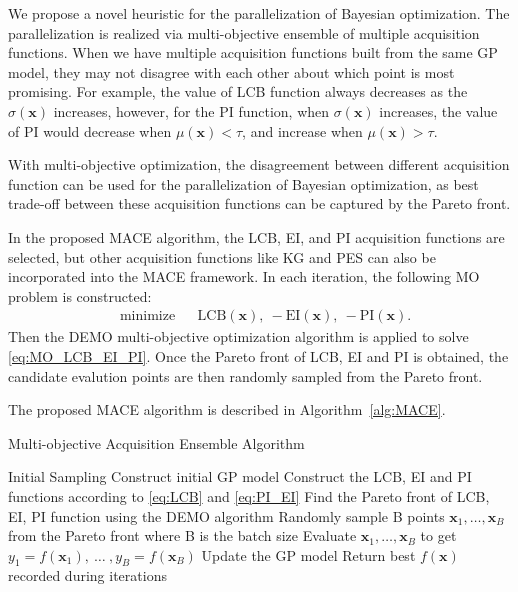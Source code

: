 We propose a novel heuristic for the parallelization of Bayesian optimization.
The parallelization is realized via multi-objective ensemble of multiple
acquisition functions. When we have multiple acquisition functions built from
the same GP model, they may not disagree with each other about which point is
most promising. For example, the value of LCB function always decreases as the
$\sigma(\bm{x})$ increases, however, for the PI function, when $\sigma(\bm{x})$
increases, the value of PI would decrease when $\mu(\bm{x}) < \tau$, and
increase when $\mu(\bm{x}) > \tau$.


With multi-objective optimization, the disagreement between different
acquisition function can be used for the parallelization of Bayesian
optimization, as best trade-off between these acquisition functions can be
captured by the Pareto front.

In the proposed MACE algorithm, the LCB, EI, and PI acquisition functions are selected, but other acquisition functions like KG and PES can also be incorporated into the MACE framework. In each iteration, the following MO problem is constructed:
\begin{equation}
    \label{eq:MO_LCB_EI_PI}
    \begin{aligned}
        & \text{minimize} & & \mathrm{LCB}(\bm{x}),~-\mathrm{EI}(\bm{x}),~-\mathrm{PI}(\bm{x}).
    \end{aligned}
\end{equation}
Then the DEMO multi-objective optimization algorithm is applied to solve \eqref{eq:MO_LCB_EI_PI}. Once the Pareto front of LCB, EI and PI is obtained, the candidate evalution points are then randomly sampled from the Pareto front.


The proposed MACE algorithm is described in Algorithm~\ref{alg:MACE}.


\begin{algorithm}
\caption{Multi-objective Acquisition Ensemble Algorithm}
\label{alg:MACE}
\begin{algorithmic}[1]
\STATE Initial Sampling
\STATE Construct initial GP model
    \STATE Construct the LCB, EI and PI functions according to \eqref{eq:LCB} and \eqref{eq:PI_EI}
    \STATE Find the Pareto front of LCB, EI, PI function using the DEMO algorithm
    \STATE Randomly sample B points $\bm{x}_1, \dots, \bm{x}_B$ from the Pareto front where B is the batch size
    \STATE Evaluate $\bm{x}_1, \dots, \bm{x}_B$ to get $y_1 = f(\bm{x}_1),~\dots~,y_B = f(\bm{x}_B)$
    \STATE Update the GP model
\ENDFOR
\STATE Return best $f(\bm{x})$ recorded during iterations
\end{algorithmic}
\end{algorithm}
